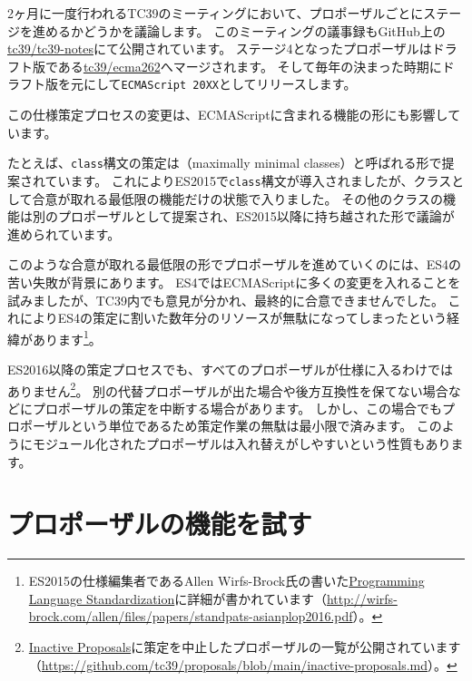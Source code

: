 2ヶ月に一度行われるTC39のミーティングにおいて、プロポーザルごとにステージを進めるかどうかを議論します。
このミーティングの議事録もGitHub上の\href{https://github.com/tc39/notes}{tc39/tc39-notes}にて公開されています。
ステージ4となったプロポーザルはドラフト版である\href{https://github.com/tc39/ecma262}{tc39/ecma262}へマージされます。
そして毎年の決まった時期にドラフト版を元にして\texttt{ECMAScript 20XX}としてリリースします。

この仕様策定プロセスの変更は、ECMAScriptに含まれる機能の形にも影響しています。

たとえば、\texttt{class}構文の策定は\textbf{}（maximally
minimal classes）と呼ばれる形で提案されています。
これによりES2015で\texttt{class}構文が導入されましたが、クラスとして合意が取れる最低限の機能だけの状態で入りました。
その他のクラスの機能は別のプロポーザルとして提案され、ES2015以降に持ち越された形で議論が進められています。

このような合意が取れる最低限の形でプロポーザルを進めていくのには、ES4の苦い失敗が背景にあります。
ES4ではECMAScriptに多くの変更を入れることを試みましたが、TC39内でも意見が分かれ、最終的に合意できませんでした。
これによりES4の策定に割いた数年分のリソースが無駄になってしまったという経緯があります\footnote{ES2015の仕様編集者であるAllen
  Wirfs-Brock氏の書いた\href{http://wirfs-brock.com/allen/files/papers/standpats-asianplop2016.pdf}{Programming
  Language Standardization}に詳細が書かれています（\url{http://wirfs-brock.com/allen/files/papers/standpats-asianplop2016.pdf}）。}。

ES2016以降の策定プロセスでも、すべてのプロポーザルが仕様に入るわけではありません\footnote{\href{https://github.com/tc39/proposals/blob/main/inactive-proposals.md}{Inactive
  Proposals}に策定を中止したプロポーザルの一覧が公開されています（\url{https://github.com/tc39/proposals/blob/main/inactive-proposals.md}）。}。
別の代替プロポーザルが出た場合や後方互換性を保てない場合などにプロポーザルの策定を中断する場合があります。
しかし、この場合でもプロポーザルという単位であるため策定作業の無駄は最小限で済みます。
このようにモジュール化されたプロポーザルは入れ替えがしやすいという性質もあります。

\hypertarget{try-proposal}{%
\section{プロポーザルの機能を試す}\label{try-proposal}}

